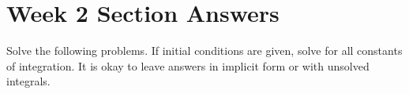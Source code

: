 \documentclass[letterpaper, fontsize=11pt]{scrartcl} %
\numberwithin{equation}{section} %
\numberwithin{figure}{section} %
\numberwithin{table}{section} %
\begin{document}

\newcommand{\horrule}[1]{\rule{\linewidth}{#1}} %


\section*{Week 2 Section Answers}
\par Solve the following problems. If initial conditions are given, solve for all constants of integration. It is okay to leave answers in implicit form or with unsolved integrals. 
\end{document}
